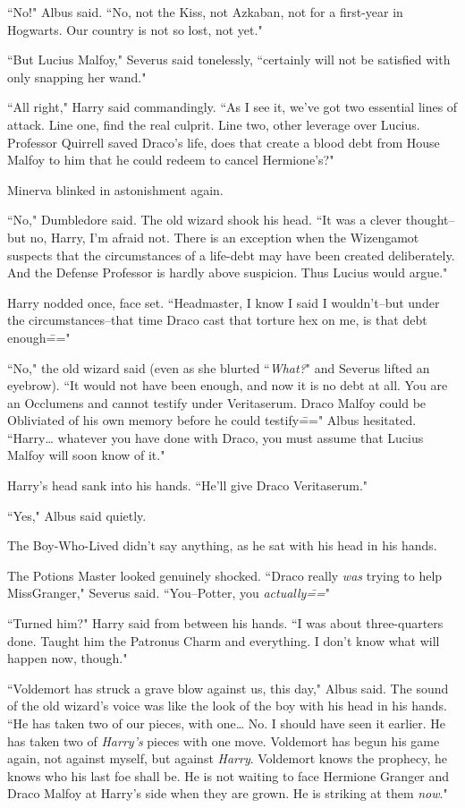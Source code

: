``No!" Albus said. ``No, not the Kiss, not Azkaban, not for a first-year in Hogwarts. Our country is not so lost, not yet."

``But Lucius Malfoy," Severus said tonelessly, ``certainly will not be satisfied with only snapping her wand."

``All right," Harry said commandingly. ``As I see it, we've got two essential lines of attack. Line one, find the real culprit. Line two, other leverage over Lucius. Professor Quirrell saved Draco's life, does that create a blood debt from House Malfoy to him that he could redeem to cancel Hermione's?"

Minerva blinked in astonishment again.

``No," Dumbledore said. The old wizard shook his head. ``It was a clever thought\---but no, Harry, I'm afraid not. There is an exception when the Wizengamot suspects that the circumstances of a life-debt may have been created deliberately. And the Defense Professor is hardly above suspicion. Thus Lucius would argue."

Harry nodded once, face set. ``Headmaster, I know I said I wouldn't\---but under the circumstances\---that time Draco cast that torture hex on me, is that debt enough\==="

``No," the old wizard said (even as she blurted ``\emph{What?}" and Severus lifted an eyebrow). ``It would not have been enough, and now it is no debt at all. You are an Occlumens and cannot testify under Veritaserum. Draco Malfoy could be Obliviated of his own memory before he could testify\===" Albus hesitated. ``Harry{\ldots} whatever you have done with Draco, you must assume that Lucius Malfoy will soon know of it."

Harry's head sank into his hands. ``He'll give Draco Veritaserum."

``Yes," Albus said quietly.

The Boy-Who-Lived didn't say anything, as he sat with his head in his hands.

The Potions Master looked genuinely shocked. ``Draco really \emph{was} trying to help Miss\?Granger," Severus said. ``You\---Potter, you \emph{actually\===}"

``Turned him?" Harry said from between his hands. ``I was about three-quarters done. Taught him the Patronus Charm and everything. I don't know what will happen now, though."

``Voldemort has struck a grave blow against us, this day," Albus said. The sound of the old wizard's voice was like the look of the boy with his head in his hands. ``He has taken two of our pieces, with one{\ldots} No. I should have seen it earlier. He has taken two of \emph{Harry's} pieces with one move. Voldemort has begun his game again, not against myself, but against \emph{Harry}. Voldemort knows the prophecy, he knows who his last foe shall be. He is not waiting to face Hermione Granger and Draco Malfoy at Harry's side when they are grown. He is striking at them \emph{now}."

